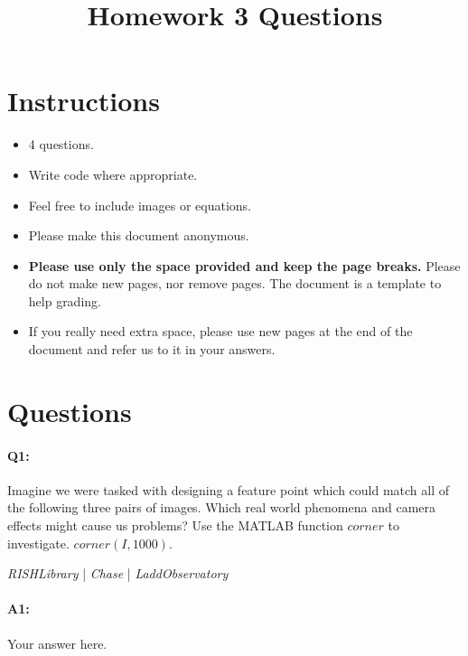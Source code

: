 \title{\vspace{-1cm}Homework 3 Questions}



\maketitle
\vspace{-3cm}
\thispagestyle{fancy}

\section*{Instructions}
\begin{itemize}
  \item 4 questions.
  \item Write code where appropriate.
  \item Feel free to include images or equations.
  \item Please make this document anonymous.
  \item \textbf{Please use only the space provided and keep the page breaks.} Please do not make new pages, nor remove pages. The document is a template to help grading.
  \item If you really need extra space, please use new pages at the end of the document and refer us to it in your answers.
\end{itemize}

\section*{Questions}

\paragraph{Q1:} Imagine we were tasked with designing a feature point which could match all of the following three pairs of images. Which real world phenomena and camera effects might cause us problems?
Use the MATLAB function \href{https://www.mathworks.com/help/images/ref/corner.html}{$corner$} to investigate. $corner(I,1000)$.

\emph{RISHLibrary} | \emph{Chase} | \emph{LaddObservatory}

\paragraph{A1:} Your answer here.

